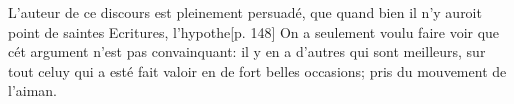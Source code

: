 \pend 
\pstart  [p. 147] L'auteur de ce discours est pleinement persuad\'{e}, que quand bien il n'y auroit point de saintes Ecritures, l'hypothe[p. 148] On a seulement voulu faire voir que c\'{e}t argument n'est pas convainquant: il y en a d'autres qui sont meilleurs, sur tout celuy qui a est\'{e} fait valoir en de fort belles occasions; pris du mouvement  de l'aiman.
\pend
 \count{}
 \count{}
 \count{}

